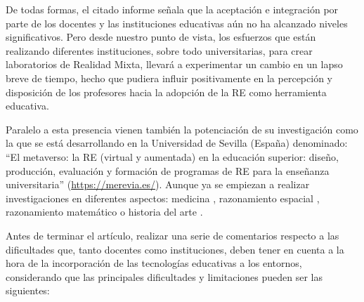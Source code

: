 \documentclass[spanish]{textolivre}
\begin{document}
De todas formas, el citado informe señala que la aceptación e integración por parte de los docentes y las instituciones educativas aún no ha alcanzado niveles significativos. Pero desde nuestro punto de vista, los esfuerzos que están realizando diferentes instituciones, sobre todo universitarias, para crear laboratorios de Realidad Mixta, llevará a experimentar un cambio en un lapso breve de tiempo, hecho que pudiera influir positivamente en la percepción y disposición de los profesores hacia la adopción de la RE como herramienta educativa.

Paralelo a esta presencia vienen también la potenciación de su investigación como la que se está desarrollando en la Universidad de Sevilla (España) denominado: “El metaverso: la RE (virtual y aumentada) en la educación superior: diseño, producción, evaluación y formación de programas de RE para la enseñanza universitaria” (\url{https://merevia.es/}). Aunque ya se empiezan a realizar investigaciones en diferentes aspectos: medicina \cite{birt_2017,kukulska-hulme2021innovating}, razonamiento espacial \cite{tang2020evaluating}, razonamiento matemático \cite{cabero2021mixed} o historia del arte \cite{cabero2020use}.

Antes de terminar el artículo, realizar una serie de comentarios respecto a las dificultades que, tanto docentes como instituciones, deben tener en cuenta a la hora de la incorporación de las tecnologías educativas a los entornos, considerando que las principales dificultades y limitaciones pueden ser las siguientes:
\end{document}
